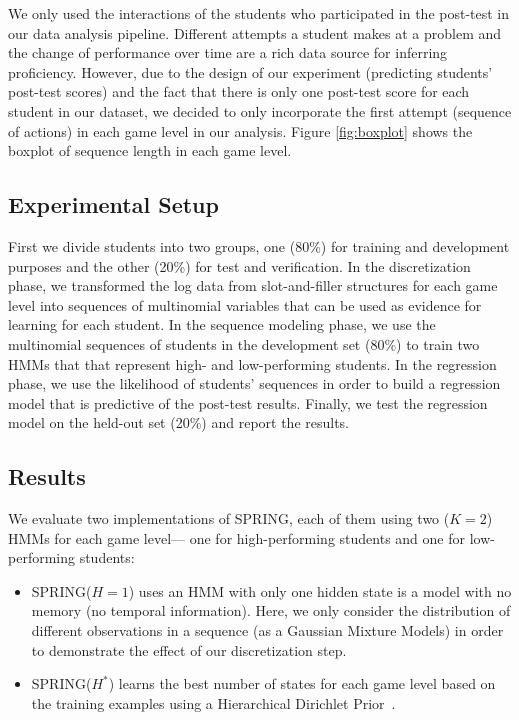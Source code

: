 \documentclass{sigchi}
\def\algname{SPRING\xspace}
\begin{document}
	We only used the interactions of the students who participated in the post-test in our data analysis pipeline.
	Different attempts a student makes at a problem and the change of performance over time are a rich data source for inferring proficiency.
	However, due to the design of our experiment (predicting students' post-test scores) and the fact that there is only one post-test score for each student in our dataset, we decided to  only incorporate the first attempt (sequence of actions) in each game level in our analysis. Figure \ref{fig:boxplot} shows the boxplot of sequence length in each game level. 
	
	\subsection{Experimental Setup}
	First we divide students into two groups, one (80\%) for training and development purposes and the other (20\%) for test and verification.
	In the discretization phase, we transformed the log data from slot-and-filler structures for each game level into sequences of multinomial variables that can be used as evidence for learning for each student.
	In the sequence modeling phase, we use the multinomial sequences of students in the development set (80\%) to train two HMMs that that represent high- and low-performing students.
	In the regression phase, we use the likelihood of students' sequences in order to build a regression model that is predictive of the post-test results.
	Finally, we test the regression model on the held-out set (20\%) and report the results.
	
	\subsection{Results}
	
	
	We evaluate two implementations of SPRING, each of them using two ($K=2$) HMMs for each game level--- one for high-performing students and one for low-performing students:
	\begin{itemize}
		\item \algname ($H=1$)  uses an HMM with only one hidden state is a model with no memory (no temporal information).
		Here, we only consider the distribution of different observations in a sequence (as a Gaussian Mixture Models) in order to demonstrate the effect of our discretization step.
		\item \algname ($H^*$) learns the best number of states for each game level based on the training examples using a Hierarchical Dirichlet Prior~\cite{fox2008hdp}.
	\end{itemize} 
	
\end{document}
